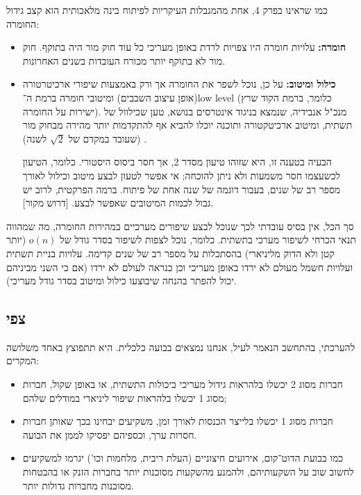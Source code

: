 \documentclass[]{article}
\theoremstyle{definition}
\begin{document}
	כמו שראינו בפרק 4, אחת מהמגבלות העיקריות לפיתוח בינה מלאכותית הוא קצב גידול החומרה: 
	\begin{itemize}
		\item \textbf{חומרה: }עלויות חומרה היו צפויות לרדת באופן מעריכי כל עוד חוק מור היה בתוקף. חוק מור לא בתוקף יותר מכורח העובדות בשנים האחרונות. 
		
		\item \textbf{כילול ומיטוב: }על כן, נוכל לשפר את החומרה אך ורק באמצעות שיפורי ארכיטרטורה (אופן עיצוב השבבים) ומיטובי חומרה ברמת ה־low level (כלומר, ברמת הקוד שרץ ישירות על החומרה). מנכ"ל אנבידיה, שנמצא בניגוד אינטרסים בנושא, טען שכילוול של תשתית, ומיטוב ארכיטקטורה ותוכנה יוכלו להביא אף להתקדמות יותר מהירה מבחוק מור (שעובד במקדם של $\sqrt2$ לשנה) \cite{HuangLaw}. 
		
		הבעיה בטענה זו, היא שזוהו טיעון מסדר 2, אך חסר ביסוס היסטורי. כלומר, הטיעון לכשעצמו חסר משמעות ולא ניתן להוכחה; אי אפשר לטעון לבצע מיטוב וכילול לאורך מספר רב של שנים, בעבור דוגמה של שנה אחת של פיתוח. ברמה הפרקטית, לרוב יש גבול לכמות המיטובים שאפשר לבצע. [דרוש מקור]. 
	\end{itemize}
	
	סך הכל, אין בסיס עובדתי לכך שנוכל לבצע שיפורים מערכיים במהירות החומרה, מה שמהווה תנאי הכרחי לשיפור מערכי בתשתית. כלומר, נוכל לצפות לשיפור בסדר גודל של $o(n)$ (יותר קטן ולא הדוק מליניארי) בהסתכלות על מספר רב של שנים קדימה. עלויות בניית תשתית ועלויות חשמל מעולם לא ירדו באופן מעריכי וכן כנראה לעולם לא ירדו (אם כי השני מביניהם יכול להפתר בהנחה שיבוצעו כילול ומיטוב בסדר גודל מעריכי). 
	
	\subsection{צפי}
	להערכתי, בהתחשב הנאמר לעיל, אנחנו נמצאים בבועה כלכלית. היא תתפוצץ באחד משלושה המקרים: 
	\begin{itemize}
		\item חברות מסוג 2 יכשלו בלהראות גידול מעריכי ביכולות התשתית, או באופן שקול, חברות מסוג 1 יכשלו בלהראות שיפור ליניארי במודלים שלהם;
		\item חברות מסוג 1 יכשלו בלייצר הכנסות לאורך זמן, משקיעים יבחינו בכך שאותן חברות חסרות ערך, וכספיהם יפסיקו לממן את הבועה. 
		\item כמו בבועת הדוט־קום, אירועים חיצוניים (העלת ריבית, מלחמות וכו') יגרמו למשקיעים לחשוב שוב על השקעותיהם, ולהמנע מהשקעות מסוכנות יותר בחברות הזנק או בהבטחות מסוכנות מחברות גדולות יותר. 
	\end{itemize}
	
\end{document}
